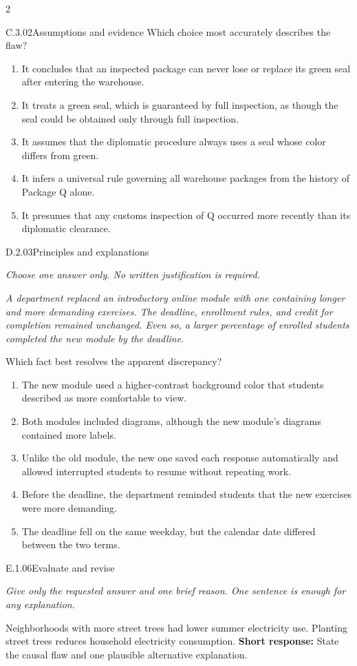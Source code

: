 \documentclass[9pt]{extarticle}
\newcommand{\choice}[1]{\item #1}
\begin{document}
\begin{multicols}{2}
\begin{DenseCoreProblem}{C.3.02}{Assumptions and evidence}
Which choice most accurately describes the flaw?
\begin{enumerate}[label=(\alph*)]
  \choice{It concludes that an inspected package can never lose or replace its green seal after entering the warehouse.}
  \choice{It treats a green seal, which is guaranteed by full inspection, as though the seal could be obtained only through full inspection.}
  \choice{It assumes that the diplomatic procedure always uses a seal whose color differs from green.}
  \choice{It infers a universal rule governing all warehouse packages from the history of Package Q alone.}
  \choice{It presumes that any customs inspection of Q occurred more recently than its diplomatic clearance.}
\end{enumerate}
\end{DenseCoreProblem}
\begin{DenseCoreProblem}{D.2.03}{Principles and explanations}
{\scriptsize\textit{Choose one answer only. No written justification is required.}\par}
\emph{A department replaced an introductory online module with one containing longer and more demanding exercises. The deadline, enrollment rules, and credit for completion remained unchanged. Even so, a larger percentage of enrolled students completed the new module by the deadline.}

Which fact best resolves the apparent discrepancy?
\begin{enumerate}[label=(\alph*)]
  \choice{The new module used a higher-contrast background color that students described as more comfortable to view.}
  \choice{Both modules included diagrams, although the new module's diagrams contained more labels.}
  \choice{Unlike the old module, the new one saved each response automatically and allowed interrupted students to resume without repeating work.}
  \choice{Before the deadline, the department reminded students that the new exercises were more demanding.}
  \choice{The deadline fell on the same weekday, but the calendar date differed between the two terms.}
\end{enumerate}
\end{DenseCoreProblem}
\begin{DenseCoreProblem}{E.1.06}{Evaluate and revise}
{\scriptsize\textit{Give only the requested answer and one brief reason. One sentence is enough for any explanation.}\par}
Neighborhoods with more street trees had lower summer electricity use. Planting street trees reduces household electricity consumption.
\textbf{Short response:} State the causal flaw and one plausible alternative explanation.
\end{DenseCoreProblem}
\end{multicols}
\end{document}
